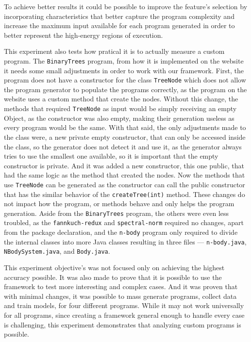 To achieve better results it could be possible to improve the feature's selection by incorporating characteristics that better capture the program complexity and increase the maximum input available for each program generated in order to better represent the high-energy regions of execution.


This experiment also tests how pratical it is to actually measure a custom program. 
The \texttt{BinaryTrees} program, from how it is implemented on the website it needs some small adjustments in order to work with our framework. First, the program does not have a constructor for the class \texttt{TreeNode} which does not allow the program generator to populate the programs correctly, as the program on the website uses a custom method that create the nodes. Without this change, the methods that required \texttt{TreeNode} as input would be simply receiving an empty Object, as the constructor was also empty, making their generation useless as every program would be the same.
With that said, the only adjustments made to the class were, a new private empty constructor, that can only be accessed inside the class, so the generator does not detect it and use it, as the generator always tries to use the smallest one available, so it is important that the empty constructor is private. And it was added a new constructor, this one public, that had the same logic as the method that created the nodes. Now the methods that use \texttt{TreeNode} can be generated as the constructor can call the public constructor that has the similar behavior of the \texttt{createTree(int)} method. These changes do not impact how the program, or methods behave and only helps the program generation.
Aside from the \texttt{BinaryTrees} program, the others were even less troubled, as the \texttt{fannkuch-redux} and \texttt{spectral-norm} required no changes, apart from the package declaration, and the \texttt{n-body} program only required to divide the internal classes into more Java classes resulting in three files — \texttt{n-body.java}, \texttt{NBodySystem.java}, and \texttt{Body.java}.


This experiment objective's was not focused only on achieving the highest accuracy possible. It was also made to prove that it is possible to use the framework to test more interesting and complex cases. And it was proven that with minimal changes, it was possible to mass generate programs, collect data and train models, for four different programs. While it may not work universally for all programs, since creating a framework general enough to handle every case is challenging, this experiment demonstrates that analyzing custom programs is possible.






